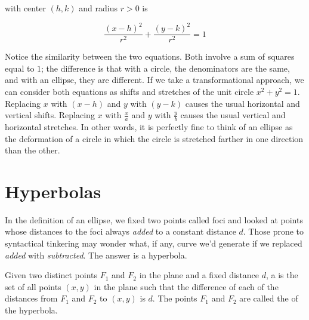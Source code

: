 \documentclass[nooutcomes]{ximera}
\begin{document}
\begin{definition}   with center $(h,k)$ and radius $r >0$ is

\[ \dfrac{(x-h)^2}{r^2} + \dfrac{(y-k)^2}{r^2} = 1 \]

\end{definition}
  
Notice the similarity between the two equations. Both involve a sum of squares equal to $1$;  the difference is that with a circle, the denominators are the same, and with an ellipse, they are different.  If we take a transformational approach, we can consider both equations as shifts and stretches of the unit circle $x^2 + y^2 = 1$.  Replacing $x$ with $(x-h)$ and $y$ with $(y-k)$ causes the usual horizontal and vertical shifts.  Replacing $x$ with $\frac{x}{a}$ and $y$ with $\frac{y}{b}$ causes the usual vertical and horizontal stretches.  In other words, it is perfectly fine to think of an ellipse as the deformation of a circle in which the circle is stretched farther in one direction than the other.

\section{Hyperbolas}
In the definition of an ellipse, we fixed two points called foci and looked at points whose distances to the foci always \emph{added} to a constant distance $d$.  Those prone to syntactical tinkering may wonder what, if any, curve we'd generate if we replaced \emph{added} with \emph{subtracted}.  The answer is a hyperbola.

\begin{definition}
Given two distinct points $F_{1}$ and $F_{2}$ in the plane and a fixed distance $d$, a    is the set of all points $(x, y)$ in the plane such that the difference of each of the distances from $F_{1}$ and $F_{2}$ to $(x, y)$ is $d$.  The points $F_{1}$ and $F_{2}$ are called the   of the hyperbola.
\end{definition}
\end{document}
